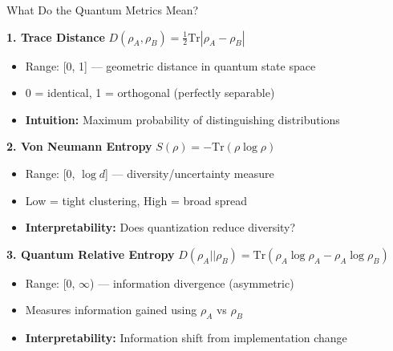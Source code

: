 \documentclass[aspectratio=169,11pt]{beamer}
\begin{document}
\begin{frame}{What Do the Quantum Metrics Mean?}

\textbf{1. Trace Distance} $D(\rho_A, \rho_B) = \frac{1}{2}\text{Tr}|\rho_A - \rho_B|$
\begin{itemize}
  \item Range: [0, 1] — geometric distance in quantum state space
  \item 0 = identical, 1 = orthogonal (perfectly separable)
  \item \textbf{Intuition:} Maximum probability of distinguishing distributions
\end{itemize}

\vspace{0.3em}

\textbf{2. Von Neumann Entropy} $S(\rho) = -\text{Tr}(\rho \log \rho)$
\begin{itemize}
  \item Range: [0, $\log d$] — diversity/uncertainty measure
  \item Low = tight clustering, High = broad spread
  \item \textbf{Interpretability:} Does quantization reduce diversity?
\end{itemize}

\vspace{0.3em}

\textbf{3. Quantum Relative Entropy} $D(\rho_A || \rho_B) = \text{Tr}(\rho_A \log \rho_A - \rho_A \log \rho_B)$
\begin{itemize}
  \item Range: [0, $\infty$) — information divergence (asymmetric)
  \item Measures information gained using $\rho_A$ vs $\rho_B$
  \item \textbf{Interpretability:} Information shift from implementation change
\end{itemize}

\end{frame}
\end{document}
